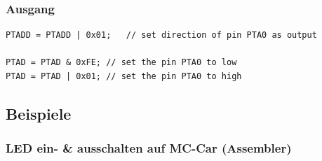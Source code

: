 \subsubsection{Ausgang}
\begin{lstlisting}
PTADD = PTADD | 0x01;	// set direction of pin PTA0 as output

PTAD = PTAD & 0xFE;	// set the pin PTA0 to low
PTAD = PTAD | 0x01;	// set the pin PTA0 to high
\end{lstlisting}

\newpage
\subsection{Beispiele}

\subsubsection{LED ein- \& ausschalten auf MC-Car (Assembler)}

